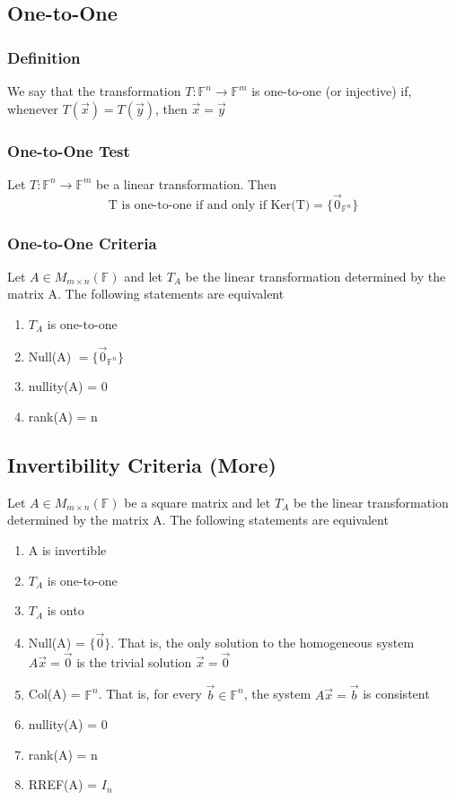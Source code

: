 \documentclass[12pt, letterpaper]{article}
\begin{document}
\subsection{One-to-One}
\subsubsection{Definition}
We say that the transformation $T: \mathbb{F}^n \rightarrow\mathbb{F}^m$ is one-to-one (or injective)
if, whenever $T(\vec{x}) = T(\vec{y})$, then $\vec{x}=\vec{y}$
\subsubsection{One-to-One Test}
Let $T: \mathbb{F}^n \rightarrow\mathbb{F}^m$ be a linear transformation. Then 
\[\text{T is one-to-one if and only if Ker(T)}=\{\vec{0}_{\mathbb{F}^n}\}\]
\subsubsection{One-to-One Criteria}
Let $A\in M_{m\times n}(\mathbb{F})$ and let $T_A$ be the linear transformation determined by the matrix A. The following statements are equivalent 
\begin{enumerate}
    \item $T_A$ is one-to-one 
    \item Null(A) $=\{\vec{0}_{\mathbb{F}^n}\}$
    \item nullity(A) = 0
    \item rank(A) = n
\end{enumerate}
\subsection{Invertibility Criteria (More)}
Let $A\in M_{m\times n}(\mathbb{F})$ be a square matrix and let $T_A$ be the linear transformation determined by the matrix A. The following statements are equivalent 
\begin{enumerate}
    \item A is invertible
    \item $T_A$ is one-to-one 
    \item $T_A$ is onto 
    \item Null(A) = $\{\vec{0}\}$. That is, the only solution to the homogeneous system $A\vec{x} = \vec{0}$ is the trivial solution $\vec{x} = \vec{0}$
    \item Col(A) = $\mathbb{F}^n$. That is, for every $\vec{b}\in\mathbb{F}^n$, the system $A\vec{x} = \vec{b}$ is consistent 
    \item nullity(A) = 0
    \item rank(A) = n 
    \item RREF(A) = $I_n$
\end{enumerate}
\end{document}
